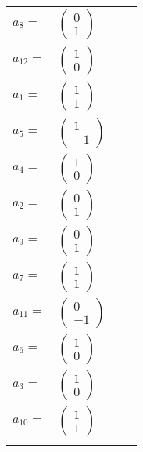 \documentclass[1p]{elsarticle_modified}
\theoremstyle{definition}
\begin{document}
\begin{tabular}{m{7pt} m{180pt} m{7pt} m{180pt} }
\flushright $a_{8}=$&$\begin{pmatrix}0\\1\end{pmatrix}$ \\
\flushright $a_{12}=$&$\begin{pmatrix}1\\0\end{pmatrix}$ \\
\flushright $a_{1}=$&$\begin{pmatrix}1\\1\end{pmatrix}$ \\
\flushright $a_{5}=$&$\begin{pmatrix}1\\-1\end{pmatrix}$ \\
\flushright $a_{4}=$&$\begin{pmatrix}1\\0\end{pmatrix}$ \\
\flushright $a_{2}=$&$\begin{pmatrix}0\\1\end{pmatrix}$ \\
\flushright $a_{9}=$&$\begin{pmatrix}0\\1\end{pmatrix}$ \\
\flushright $a_{7}=$&$\begin{pmatrix}1\\1\end{pmatrix}$ \\
\flushright $a_{11}=$&$\begin{pmatrix}0\\-1\end{pmatrix}$ \\
\flushright $a_{6}=$&$\begin{pmatrix}1\\0\end{pmatrix}$ \\
\flushright $a_{3}=$&$\begin{pmatrix}1\\0\end{pmatrix}$ \\
\flushright $a_{10}=$&$\begin{pmatrix}1\\1\end{pmatrix}$\\&\end{tabular}
\end{document}
